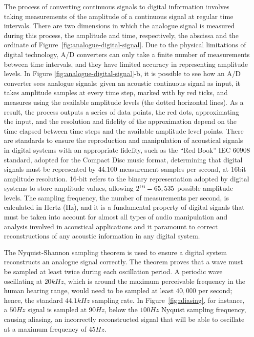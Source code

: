 The process of converting continuous signals to digital information involves taking measurements of the amplitude of a continuous signal at regular time intervals. There are two dimensions in which the analogue signal is measured during this process, the amplitude and time, respectively, the abscissa and the ordinate of Figure~\ref{fig:analogue-digital-signal}. Due to the physical limitations of digital technology, A/D converters can only take a finite number of measurements between time intervals, and they have limited accuracy in representing amplitude levels. In Figure \ref{fig:analogue-digital-signal}-b, it is possible to see how an A/D converter sees analogue signals: given an acoustic continuous signal as input, it takes amplitude samples at every time step, marked with by red ticks, and measures using the available amplitude levels (the dotted horizontal lines). As a result, the process outputs a series of data points, the red dots, approximating the input, and the resolution and fidelity of the approximation depend on the time elapsed between time steps and the available amplitude level points. There are standards to ensure the reproduction and manipulation of acoustical signals in digital systems with an appropriate fidelity, such as the ``Red Book'' IEC 60908 standard, adopted for the Compact Disc music format, determining that digital signals must be represented by 44.100 measurement samples per second, at 16bit amplitude resolution. 16-bit refers to the binary representation adopted by digital systems to store amplitude values, allowing $2\textsuperscript{16}=65,535$ possible amplitude levels. The sampling frequency, the number of measurements per second, is calculated in Hertz (Hz), and it is a fundamental property of digital signals that must be taken into account for almost all types of audio manipulation and analysis involved in acoustical applications and it paramount to correct reconstructions of any acoustic information in any digital system. \par
The Nyquist-Shannon sampling theorem is used to ensure a digital system reconstructs an analogue signal correctly. The theorem proves that a wave must be sampled at least twice during each oscillation period. A periodic wave oscillating at $20kHz$, which is around the maximum perceivable frequency in the human hearing range, would need to be sampled at least $40,000$ per second; hence, the standard $44.1kHz$ sampling rate. In Figure~\ref{fig:aliasing}, for instance, a $50Hz$ signal is sampled at $90Hz$, below the $100Hz$ Nyquist sampling frequency, causing aliasing, an incorrectly reconstructed signal that will be able to oscillate at a maximum frequency of $45Hz$.\par

